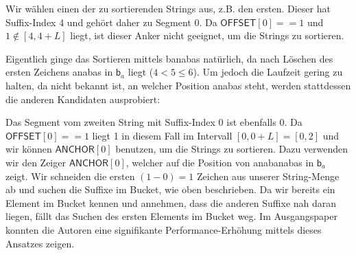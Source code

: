 Wir wählen einen der zu sortierenden Strings aus, z.B. den ersten.
Dieser hat Suffix-Index 4 und gehört daher zu Segment 0.
Da $\mathsf{OFFSET}[0] == 1$ und $1 \not \in [4, 4 + L]$ liegt, ist dieser Anker nicht geeignet, um die Strings zu sortieren.

Eigentlich ginge das Sortieren mittels \glqq banabas\grqq{} natürlich, da nach Löschen des ersten Zeichens \glqq anabas\grqq{} in $\mathsf{b}_a$ liegt ($4 < 5 \leq 6$).
Um jedoch die Laufzeit gering zu halten, da nicht bekannt ist, an welcher Position \glqq anabas\grqq{} steht, werden stattdessen die anderen Kandidaten ausprobiert:

Das Segment vom zweiten String mit Suffix-Index 0 ist ebenfalls 0.
Da $\mathsf{OFFSET}[0] == 1$ liegt 1 in diesem Fall im Intervall $[0, 0 + L] = [0, 2]$ und wir können $\mathsf{ANCHOR}[0]$ benutzen, um die Strings zu sortieren.
Dazu verwenden wir den Zeiger $\mathsf{ANCHOR}[0]$, welcher auf die Position von \glqq anabanabas\grqq{} in $\mathsf{b}_a$ zeigt.
Wir schneiden die ersten $(1 - 0) = 1$ Zeichen aus unserer String-Menge ab und suchen die Suffixe im Bucket, wie oben beschrieben.
Da wir bereits ein Element im Bucket kennen und annehmen, dass die anderen Suffixe nah daran liegen, fällt das Suchen des ersten Elements im Bucket weg.
Im Ausgangspaper konnten die Autoren eine signifikante Performance-Erhöhung mittels dieses Ansatzes zeigen.

